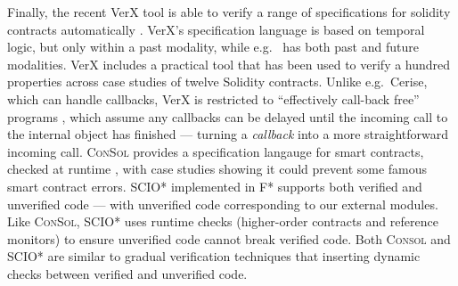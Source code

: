 




Finally, the recent VerX tool is able to verify a range of
specifications for solidity contracts automatically \cite{VerX}.
VerX's specification language is based on
temporal logic, 
but only within a past modality, while e.g.\ \citet{OOPSLA22} has both past
and future modalities.
%
%
%
VerX includes a practical tool that has
been used to verify a hundred properties across case studies of
twelve Solidity contracts.
%
%
%
Unlike e.g.\ Cerise, which can handle callbacks, VerX
is restricted to ``effectively call-back free'' programs
\cite{Grossman,Albert,relaxed-callbacks-ToDES}, which assume any
callbacks can be delayed until the
incoming call to the internal object has finished 
--- turning a \textit{callback}
into a more straightforward  incoming call. 
%
\textsc{ConSol} \cite{consolidating-pldi2024}
provides a specification langauge for smart contracts,
checked at runtime \cite{FinFel01},  with case studies 
showing it could prevent some famous smart contract errors.
SCIO* \cite{secure-io-fstar-popl2024} implemented in
F*
supports both
verified and unverified code --- with unverified code 
corresponding to our external modules. 
Like \textsc{ConSol},   SCIO* uses runtime checks
(higher-order contracts and reference monitors)
to ensure unverified
code cannot break verified code.
Both \textsc{Consol} and SCIO* are 
similar to gradual verification techniques 
\cite{gradual-verification-popl2024,Cok2022} that
                                             inserting dynamic checks between verified and unverified code.



